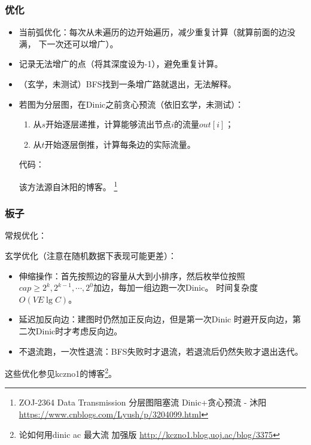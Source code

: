 \subsubsection{优化}
\begin{itemize}
	\item 当前弧优化：每次从未遍历的边开始遍历，减少重复计算（就算前面的边没满，
	      下一次还可以增广）。
	\item 记录无法增广的点（将其深度设为-1），避免重复计算。
	\item （玄学，未测试）BFS找到一条增广路就退出，无法解释。
	\item 若图为分层图，在Dinic之前贪心预流（依旧玄学，未测试）：
	      \begin{enumerate}
		      \item 从$s$开始逐层递推，计算能够流出节点$i$的流量$out[i]$；
		      \item 从$t$开始逐层倒推，计算每条边的实际流量。
	      \end{enumerate}
	      代码：

	      

	      该方法源自沐阳的博客。
	      \footnote{ZOJ-2364 Data Transmission 分层图阻塞流 Dinic+贪心预流 - 沐阳
		      \url{https://www.cnblogs.com/Lyush/p/3204099.html}}
\end{itemize}

\subsubsection{板子}

常规优化：


玄学优化（注意在随机数据下表现可能更差）：

\begin{itemize}
	\item 伸缩操作：首先按照边的容量从大到小排序，然后枚举位按照
	$cap\geq 2^k,2^{k-1},\cdots,2^0$加边，每加一组边跑一次Dinic。
	时间复杂度$O(VE\lg C)$。
	\item 延迟加反向边：建图时仍然加正反向边，但是第一次Dinic
	时避开反向边，第二次Dinic时才考虑反向边。
	\item 不退流跑，一次性退流：BFS失败时才退流，若退流后仍然失败才退出迭代。
\end{itemize}

这些优化参见kczno1的博客\footnote{
	论如何用dinic ac 最大流 加强版
	\url{http://kczno1.blog.uoj.ac/blog/3375}}。

